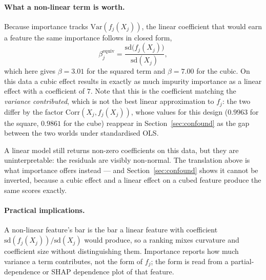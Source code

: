 \paragraph{What a non-linear term is worth.} Because importance tracks
$\mathrm{Var}(f_j(X_j))$, the linear coefficient that would earn a feature the
same importance follows in closed form,
\[
  \beta_j^{\mathrm{equiv}} =
  \frac{\mathrm{sd}\big(f_j(X_j)\big)}{\mathrm{sd}(X_j)} ,
\]
which here gives $\beta = 3.01$ for the squared term and $\beta = 7.00$ for the
cubic. On this data a cubic effect results in exactly as much impurity
importance as
a linear effect with a coefficient of $7$. Note that this is the coefficient
matching the \emph{variance contributed}, which is not the best linear
approximation to $f_j$: the two differ by the factor
$\mathrm{Corr}(X_j, f_j(X_j))$, whose values for this design ($0.9963$ for the
square, $0.9861$ for the cube) reappear in Section~\ref{sec:confound} as the
gap between the two worlds under standardised OLS.

A linear model still returns non-zero coefficients on this data, but they are
uninterpretable: the residuals are visibly non-normal. The translation above is
what importance offers instead --- and Section~\ref{sec:confound} shows it
cannot be inverted, because a cubic effect and a linear effect on a cubed
feature produce the same scores exactly.

\paragraph{Practical implications.} A non-linear feature's bar is the bar a
linear feature with coefficient $\mathrm{sd}(f_j(X_j))/\mathrm{sd}(X_j)$ would
produce, so a ranking mixes curvature and coefficient size without
distinguishing them. Importance reports how much variance a term contributes,
not the form of $f_j$; the form is read from a partial-dependence or SHAP
dependence plot of that feature.
